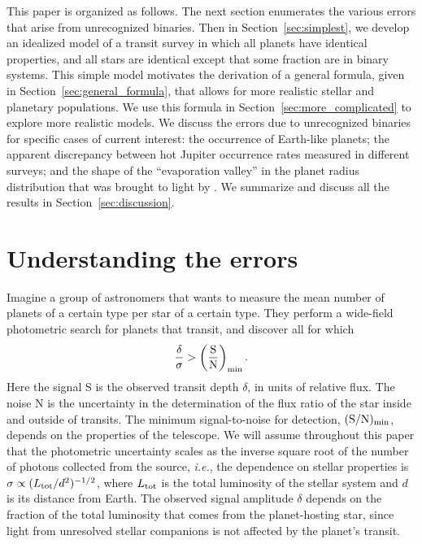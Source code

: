 \documentclass[12pt,modern]{aastex61}
\begin{document}
This paper is organized as follows.  The next section enumerates the
various errors that arise from unrecognized binaries.  Then in
Section~\ref{sec:simplest}, we develop an idealized model of a transit
survey in which all planets have identical properties, and all stars
are identical except that some fraction are in binary systems.  This
simple model motivates the derivation of a general formula, given in
Section~\ref{sec:general_formula}, that allows for more realistic
stellar and planetary populations.  We use this formula in
Section~\ref{sec:more_complicated} to explore more realistic models.
We discuss the errors due to unrecognized binaries for specific cases
of current interest: the occurrence of Earth-like planets; the
apparent discrepancy between hot Jupiter occurrence rates measured in
different surveys; and the shape of the ``evaporation valley'' in the
planet radius distribution that was brought to light by
\citet{fulton_california-_2017}.  We summarize and discuss all the
results in Section~\ref{sec:discussion}.


\section{Understanding the errors}
\label{sec:concept}

Imagine a group of astronomers that wants to measure the mean number of
planets of a certain type per star of a certain type.  They perform a
wide-field photometric search for planets that transit, and discover
all for which
\begin{equation}
  \frac{\delta}{\sigma}
  >
  \left(\frac{{\rm S}}{{\rm N}}\right)_{\rm min}.
\label{eq:S_N_thresh}
\end{equation}
Here the signal S is the observed transit depth $\delta$, in units of
relative flux.  The noise N is the uncertainty in the determination of
the flux ratio of the star inside and outside of transits.  The
minimum signal-to-noise for detection, $({\rm S}/{\rm N})_{\rm min}$,
depends on the properties of the telescope.  We will assume throughout
this paper that the photometric uncertainty scales as the inverse
square root of the number of photons collected from the source, {\it
i.e.}, the dependence on stellar properties is $\sigma \propto (L_{\rm
tot}/d^2)^{-1/2}$, where $L_{\rm tot}$ is the total luminosity of the
stellar system and $d$ is its distance from Earth.  The observed
signal amplitude $\delta$ depends on the fraction of the total
luminosity that comes from the planet-hosting star, since light from
unresolved stellar companions is not affected by the planet's transit.
\end{document}
